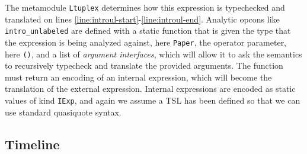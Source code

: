 The metamodule \lstinline{Ltuplex} determines how this expression is typechecked and translated on lines \ref{line:introul-start}-\ref{line:introul-end}. Analytic opcons like \lstinline{intro_unlabeled} are defined with a static function that is given the type that the expression is being analyzed against, here \lstinline{Paper}, the operator parameter, here \lstinline{()}, and a list of \emph{argument interfaces}, which will allow it to ask the semantics to recursively typecheck and translate the provided arguments. The function must return an encoding of an  internal expression, which will become the translation of the external expression. Internal expressions are encoded as static values of kind \lstinline{IExp}, and again we assume a TSL has been defined so that we can use standard quasiquote syntax.



\subsection{Timeline}\label{sec:metamodules-timeline}


